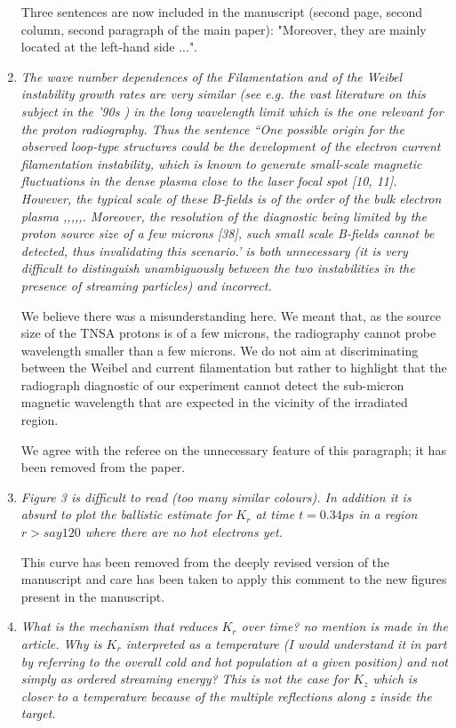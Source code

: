 \documentclass[aps,showpacs,superscriptaddress]{revtex4}%
\begin{document}
\begin{enumerate}
Three sentences are now included in the manuscript (second page, second column, second paragraph of the main paper): "Moreover, they are mainly located at the left-hand side ...".

\item \textit{The wave number dependences of the Filamentation and of the Weibel instability growth rates are very similar (see e.g. the vast literature on this subject in the '90s ) in the long wavelength limit which is the one relevant for the proton radiography. Thus the sentence ``One possible origin for the observed loop-type structures could be the development of the electron current filamentation instability, which is known to generate small-scale magnetic fluctuations in the dense plasma close to the laser focal spot [10, 11]. However, the typical scale of these B-fields is of the order of the bulk electron plasma ,,,,,. Moreover, the resolution of the diagnostic being limited by the proton source size of a few microns [38], such small scale B-fields cannot be detected, thus invalidating this scenario.' is both unnecessary (it is very difficult to distinguish unambiguously between the two instabilities in the presence of streaming particles) and incorrect.} 

We believe there was a misunderstanding here. We meant that, 
as the source size of the TNSA protons is of a few microns, the radiography cannot probe wavelength smaller than a few microns.  
We do not aim at discriminating between the Weibel and current filamentation but rather to highlight that the radiograph diagnostic of our experiment cannot detect the sub-micron magnetic wavelength that are expected in the vicinity of the irradiated region.

We  agree with the referee on the unnecessary feature of this paragraph;  it has been  removed from the  paper.

\item \textit{Figure 3 is difficult to read (too many similar colours). In addition it is absurd to plot the ballistic estimate for $K_r$ at time $ t = 0.34 ps$ in a region $r > say 120$ where there are no hot electrons yet. }

This curve has been removed from the deeply revised version of the manuscript and care has been taken to apply this comment to the new figures present in the manuscript.

\item \textit{What is the mechanism that reduces $K_r$ over time? no mention is made in the article. Why is $K_r$ interpreted as a temperature (I would understand it in part by referring to the overall cold and hot population at a given position) and not simply as ordered streaming energy? This is not the case for $K_z$ which is closer to a temperature because of the multiple reflections along z inside the target.}


\end{enumerate}
\end{document}
